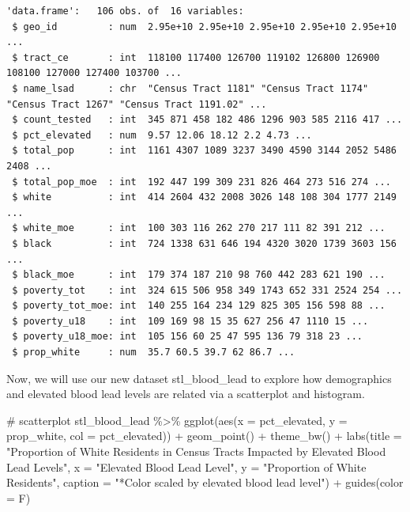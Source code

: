 \documentclass[
  letterpaper,
  DIV=11,
  numbers=noendperiod]{scrartcl}
\newenvironment{Shaded}{\begin{snugshade}}{\end{snugshade}}
\newcommand{\AttributeTok}[1]{\textcolor[rgb]{0.40,0.45,0.13}{#1}}
\newcommand{\CommentTok}[1]{\textcolor[rgb]{0.37,0.37,0.37}{#1}}
\newcommand{\FunctionTok}[1]{\textcolor[rgb]{0.28,0.35,0.67}{#1}}
\newcommand{\NormalTok}[1]{\textcolor[rgb]{0.00,0.23,0.31}{#1}}
\newcommand{\SpecialCharTok}[1]{\textcolor[rgb]{0.37,0.37,0.37}{#1}}
\newcommand{\StringTok}[1]{\textcolor[rgb]{0.13,0.47,0.30}{#1}}
\begin{document}
\begin{verbatim}
'data.frame':   106 obs. of  16 variables:
 $ geo_id         : num  2.95e+10 2.95e+10 2.95e+10 2.95e+10 2.95e+10 ...
 $ tract_ce       : int  118100 117400 126700 119102 126800 126900 108100 127000 127400 103700 ...
 $ name_lsad      : chr  "Census Tract 1181" "Census Tract 1174" "Census Tract 1267" "Census Tract 1191.02" ...
 $ count_tested   : int  345 871 458 182 486 1296 903 585 2116 417 ...
 $ pct_elevated   : num  9.57 12.06 18.12 2.2 4.73 ...
 $ total_pop      : int  1161 4307 1089 3237 3490 4590 3144 2052 5486 2408 ...
 $ total_pop_moe  : int  192 447 199 309 231 826 464 273 516 274 ...
 $ white          : int  414 2604 432 2008 3026 148 108 304 1777 2149 ...
 $ white_moe      : int  100 303 116 262 270 217 111 82 391 212 ...
 $ black          : int  724 1338 631 646 194 4320 3020 1739 3603 156 ...
 $ black_moe      : int  179 374 187 210 98 760 442 283 621 190 ...
 $ poverty_tot    : int  324 615 506 958 349 1743 652 331 2524 254 ...
 $ poverty_tot_moe: int  140 255 164 234 129 825 305 156 598 88 ...
 $ poverty_u18    : int  109 169 98 15 35 627 256 47 1110 15 ...
 $ poverty_u18_moe: int  105 156 60 25 47 595 136 79 318 23 ...
 $ prop_white     : num  35.7 60.5 39.7 62 86.7 ...
\end{verbatim}

Now, we will use our new dataset stl\_blood\_lead to explore how
demographics and elevated blood lead levels are related via a
scatterplot and histogram.

\begin{Shaded}
\begin{Highlighting}[]
\CommentTok{\# scatterplot}
\NormalTok{stl\_blood\_lead }\SpecialCharTok{\%\textgreater{}\%} \FunctionTok{ggplot}\NormalTok{(}\FunctionTok{aes}\NormalTok{(}\AttributeTok{x =}\NormalTok{ pct\_elevated, }\AttributeTok{y =}\NormalTok{ prop\_white, }\AttributeTok{col =}\NormalTok{ pct\_elevated)) }\SpecialCharTok{+} \FunctionTok{geom\_point}\NormalTok{() }\SpecialCharTok{+} \FunctionTok{theme\_bw}\NormalTok{() }\SpecialCharTok{+} \FunctionTok{labs}\NormalTok{(}\AttributeTok{title =} \StringTok{"Proportion of White Residents in Census Tracts Impacted by Elevated Blood Lead Levels"}\NormalTok{, }\AttributeTok{x =} \StringTok{"Elevated Blood Lead Level"}\NormalTok{, }\AttributeTok{y =} \StringTok{"Proportion of White Residents"}\NormalTok{, }\AttributeTok{caption =} \StringTok{"*Color scaled by elevated blood lead level"}\NormalTok{) }\SpecialCharTok{+} \FunctionTok{guides}\NormalTok{(}\AttributeTok{color =}\NormalTok{ F)}
\end{Highlighting}
\end{Shaded}
\end{document}
